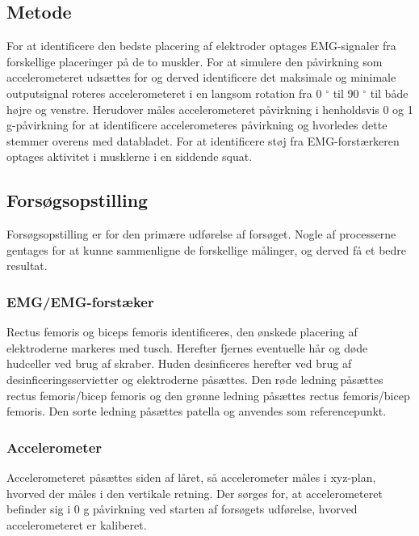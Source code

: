 \subsection{Metode}

For at identificere den bedste placering af elektroder optages EMG-signaler fra forskellige placeringer på de to muskler. 
For at simulere den påvirkning som accelerometeret udsættes for og derved identificere det maksimale og minimale outputsignal roteres accelerometeret i en langsom rotation fra 0 $^{\circ}$ til 90 $^{\circ}$  til både højre og venstre. Herudover måles accelerometeret påvirkning i henholdsvis 0 og 1 g-påvirkning for at identificere accelerometeres påvirkning og hvorledes dette stemmer overens med databladet. 
For at identificere støj fra EMG-forstærkeren optages aktivitet i musklerne i en siddende squat.

\subsection{Forsøgsopstilling}
Forsøgsopstilling er for den primære udførelse af forsøget. Nogle af processerne gentages for at kunne sammenligne de forskellige målinger, og derved få et bedre resultat.

\subsubsection{EMG/EMG-forstæker}
Rectus femoris og biceps femoris identificeres, den ønskede placering af elektroderne markeres med tusch. Herefter fjernes eventuelle hår og døde hudceller ved brug af skraber. Huden desinficeres herefter ved brug af desinficeringsservietter og elektroderne påsættes. Den røde ledning påsættes rectus femoris/bicep femoris og den grønne ledning påsættes rectus femoris/bicep femoris. Den sorte ledning påsættes patella og anvendes som referencepunkt.

\subsubsection{Accelerometer}
Accelerometeret påsættes siden af låret, så accelerometer måles i xyz-plan, hvorved der måles i den vertikale retning. Der sørges for,  at accelerometeret befinder sig i 0 g påvirkning ved starten af forsøgets udførelse, hvorved accelerometeret er kaliberet. 

